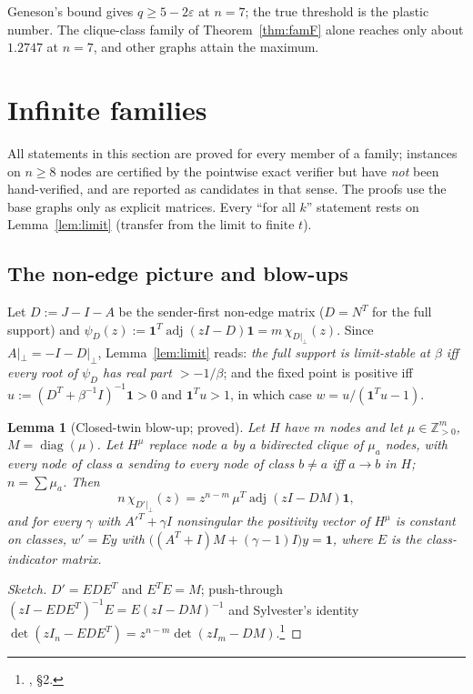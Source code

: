 \documentclass[11pt]{article}
\newtheorem{lemma}[theorem]{Lemma}
\theoremstyle{definition}
\newcommand{\one}{\mathbf{1}}
\newcommand{\eps}{\varepsilon}
\newcommand{\perpc}[1]{#1|_{\perp}}
\newcommand{\adj}{\operatorname{adj}}
\begin{document}
Geneson's bound gives $q\ge5-2\eps$ at $n=7$; the true threshold is the plastic number. The clique-class family of
Theorem~\ref{thm:famF} alone reaches only about $1.2747$ at $n=7$, and other graphs attain the maximum.

\section{Infinite families}\label{sec:families}

All statements in this section are proved for every member of a family; instances on $n\ge8$ nodes are certified by
the pointwise exact verifier but have \emph{not} been hand-verified, and are reported as candidates in that sense. The
proofs use the base graphs only as explicit matrices. Every ``for all $k$'' statement rests on Lemma~\ref{lem:limit}
(transfer from the limit to finite $t$).

\subsection{The non-edge picture and blow-ups}
Let $D:=J-I-A$ be the sender-first non-edge matrix ($D=N^T$ for the full support) and
$\psi_D(z):=\one^T\adj(zI-D)\one=m\,\chi_{\perpc{D}}(z)$. Since $\perpc{A}=-I-\perpc{D}$, Lemma~\ref{lem:limit} reads:
\emph{the full support is limit-stable at $\beta$ iff every root of $\psi_D$ has real part $>-1/\beta$}; and the fixed point is
positive iff $u:=(D^T+\beta^{-1}I)^{-1}\one>0$ and $\one^Tu>1$, in which case $w=u/(\one^Tu-1)$.

\begin{lemma}[Closed-twin blow-up; proved]\label{lem:W}
Let $H$ have $m$ nodes and let $\mu\in\mathbb Z_{>0}^m$, $M=\operatorname{diag}(\mu)$. Let $H^\mu$ replace node $a$ by a bidirected
clique of $\mu_a$ nodes, with every node of class $a$ sending to every node of class $b\ne a$ iff $a\to b$ in $H$; $n=\sum\mu_a$.
Then
\[
n\,\chi_{\perpc{D'}}(z)=z^{n-m}\,\mu^T\adj(zI-DM)\one,
\]
and for every $\gamma$ with $A'^T+\gamma I$ nonsingular the positivity vector of $H^\mu$ is constant on classes, $w'=Ey$ with
$\bigl((A^T+I)M+(\gamma-1)I\bigr)y=\one$, where $E$ is the class-indicator matrix.
\end{lemma}
\begin{proof}[Sketch]
$D'=EDE^T$ and $E^TE=M$; push-through $(zI-EDE^T)^{-1}E=E(zI-DM)^{-1}$ and Sylvester's identity
$\det(zI_n-EDE^T)=z^{n-m}\det(zI_m-DM)$.\footnote{, \S2.}
\end{proof}
\end{document}
